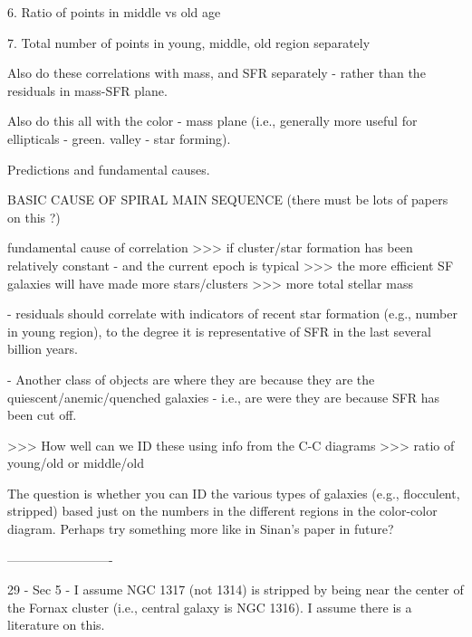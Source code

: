 6. Ratio of points in middle vs old age

7. Total number of points in young, middle, old region separately

 

Also do these correlations with mass, and SFR separately - rather than the residuals in mass-SFR plane.

 

Also do this all with the color - mass plane (i.e., generally more useful for ellipticals - green. valley - star forming).

 

 

 

Predictions and fundamental causes.

 

BASIC CAUSE OF SPIRAL MAIN SEQUENCE (there must be lots of papers on this ?)

 

 

fundamental cause of correlation >>> if  cluster/star formation has been relatively constant - and the current epoch is typical >>> the more efficient SF galaxies will have made more stars/clusters  >>> more total stellar mass

 

- residuals should correlate with indicators of recent star formation (e.g., number in young region), to the degree it is representative of SFR in the last several billion years.

 

 

 

- Another class of objects are where they are because they are the quiescent/anemic/quenched galaxies - i.e., are were they are because SFR has been cut off.

 

>>> How well can we ID these using info from the C-C diagrams >>> ratio of young/old or middle/old

 

The question is whether you can ID the various types of galaxies (e.g., flocculent, stripped) based just on the numbers in the different regions in the color-color diagram. Perhaps try something more like in Sinan's paper in future?

 

-------------------------

 

 

29 - Sec 5 - I assume NGC 1317 (not 1314)  is stripped by being near the center of the Fornax cluster (i.e., central galaxy is NGC 1316). I assume there is a literature on this.

